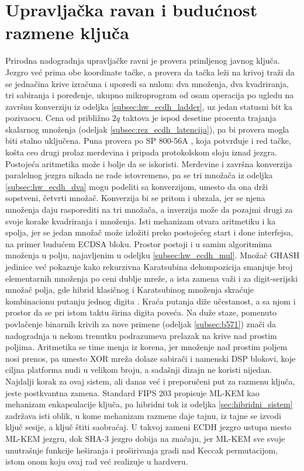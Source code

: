 \section{Upravljačka ravan i budućnost razmene ključa}
\label{sec:unap_uprava}

Prirodna nadogradnja upravljačke ravni je provera primljenog javnog ključa. Jezgro već prima obe koordinate tačke, a provera da tačka leži na krivoj traži da se jednačina krive izračuna i uporedi sa nulom: dva množenja, dva kvadriranja, tri sabiranja i poređenje, ukupno mikroprogram od osam operacija po ugledu na završnu konverziju iz odeljka \ref{subsec:hw_ecdh_ladder}, uz jedan statusni bit ka pozivaocu. Cena od približno $2q$ taktova je ispod desetine procenta trajanja skalarnog množenja (odeljak \ref{subsec:rez_ecdh_latencija}), pa bi provera mogla biti stalno uključena. Puna provera po SP 800-56A \cite{sp80056a}, koja potvrđuje i red tačke, košta ceo drugi prolaz merdevina i pripada protokolskom sloju iznad jezgra.
\smallbreak
Postojeća aritmetika može i bolje da se iskoristi. Merdevine i završna konverzija paralelnog jezgra nikada ne rade istovremeno, pa se tri množača iz odeljka \ref{subsec:hw_ecdh_dva} mogu podeliti sa konverzijom, umesto da ona drži sopstveni, četvrti množač. Konverzija bi se pritom i ubrzala, jer se njena množenja daju rasporediti na tri množača, a inverzija može da pozajmi drugi za svoje korake kvadriranja i množenja. Isti mehanizam otvara aritmetiku i ka spolja, jer se jedan množač može izložiti preko postojećeg start i done interfejsa, na primer budućem ECDSA bloku.
\smallbreak
Prostor postoji i u samim algoritmima množenja u polju, najavljenim u odeljku \ref{subsec:hw_ecdh_mul}. Množač GHASH jedinice već pokazuje kako rekurzivna Karatsubina dekompozicija smanjuje broj elementarnih množenja po ceni dublje mreže, a ista zamena važi i za digit-serijski množač polja, gde hibrid klasičnog i Karatsubinog množenja skraćuje kombinacionu putanju jednog digita \cite{kumari_gf2m_mult}. Kraća putanja diže učestanost, a sa njom i prostor da se pri istom taktu širina digita poveća.
\smallbreak
Na duže staze, pomenuto povlačenje binarnih krivih za nove primene (odeljak \ref{subsec:b571}) znači da nadogradnja u nekom trenutku podrazumeva prelazak na krive nad prostim poljima. Aritmetika se time menja iz korena, jer množenje nad prostim poljem nosi prenos, pa umesto XOR mreža dolaze sabirači i namenski DSP blokovi, koje ciljna platforma nudi u velikom broju, a sadašnji dizajn ne koristi nijedan.
\smallbreak
Najdalji korak za ovaj sistem, ali danas već i preporučeni put za razmenu ključa, jeste postkvantna zamena. Standard FIPS 203 \cite{fips203} propisuje ML-KEM kao mehanizam enkapsulacije ključa, pa hibridni tok iz odeljka \ref{sec:hibridni_sistem} zadržava isti oblik, u kome mehanizam razmene daje tajnu, iz tajne se izvodi ključ sesije, a ključ štiti saobraćaj. U takvoj zameni ECDH jezgro ustupa mesto ML-KEM jezgru, dok SHA-3 jezgro dobija na značaju, jer ML-KEM sve svoje unutrašnje funkcije heširanja i proširivanja gradi nad Keccak permutacijom, istom onom koju ovaj rad već realizuje u hardveru.
